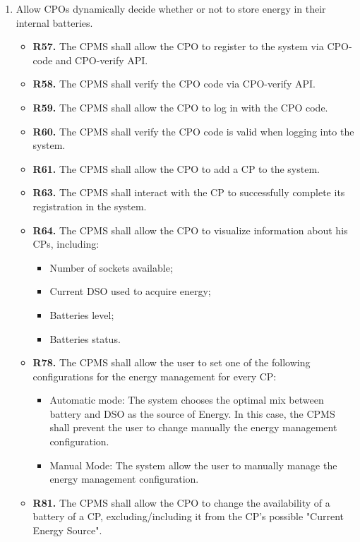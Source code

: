 \documentclass{Configuration_Files/PoliMi3i_thesis}
\begin{document}
\begin{enumerate}[label=\textbf{G\arabic*}]
    \item Allow CPOs dynamically decide whether or not to store energy in their internal batteries.
        \begin{itemize}
            \item \textbf{R57.} The CPMS shall allow the CPO to register to the system via CPO-code and CPO-verify API.
            \item \textbf{R58.} The CPMS shall verify the CPO code via CPO-verify API.
            \item \textbf{R59.} The CPMS shall allow the CPO to log in with the CPO code.
            \item \textbf{R60.} The CPMS shall verify the CPO code is valid when logging into the system.
            \item \textbf{R61.} The CPMS shall allow the CPO to add a CP to the system.
            \item \textbf{R63.} The CPMS shall interact with the CP to successfully complete its registration in the system.
            \item \textbf{R64.} The CPMS shall allow the CPO to visualize information about his CPs, including:
                \begin{itemize}
                    \item Number of sockets available;
                    \item Current DSO used to acquire energy;
                    \item Batteries level;
                    \item Batteries status.
                \end{itemize}
            \item \textbf{R78.} The CPMS shall allow the user to set one of the following configurations for the energy management for every CP:
                \begin{itemize}
                    \item Automatic mode: The system chooses the optimal mix between battery and DSO as the source of Energy. In this case, the CPMS shall prevent the user to change manually the energy management configuration.
                    \item Manual Mode: The system allow the user to manually  manage the energy management configuration.
                \end{itemize}
            \item \textbf{R81.} The CPMS shall allow the CPO to change the availability of a battery of a CP, excluding/including it from the CP's possible "Current Energy Source".

\end{itemize}
\end{enumerate}
\end{document}
